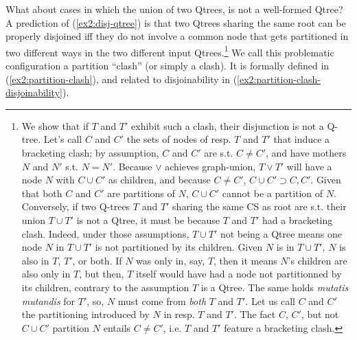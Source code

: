 
What about cases in which the union of two Qtrees, is not a well-formed Qtree? A prediction of (\ref{ex2:disj-qtree}) is that two Qtrees sharing the same root can be properly disjoined iff they do not involve a common node that gets partitioned in two different ways in the two different input Qtrees.\footnote{We show that if $T$ and $T'$ exhibit such a clash, their disjunction is not a Q-tree. Let's call $C$ and $C'$ the sets of nodes of resp. $T$ and $T'$ that induce a bracketing clash; by assumption, $C$ and $C'$ are s.t. $C\neq C'$, and have mothers $N$ and $N'$ s.t. $N=N'$. Because $\vee$ achieves graph-union, $T\vee T'$ will have a node $N$ with $C\cup C'$ as children, and because $C\neq C'$, $C\cup C' \supset C, C'$. Given that both $C$ and $C'$ are partitions of $N$, $C\cup C'$ cannot be a partition of $N$. Conversely, if two Q-trees $T$ and $T'$ sharing the same CS as root are s.t. their union $T \cup T'$ is not a Qtree, it must be because $T$ and $T'$ had a bracketing clash. Indeed, under those assumptions, $T \cup T'$ not being a Qtree means one node $N$ in $T \cup T'$ is not partitioned by its children. Given $N$ is in $T \cup T'$, $N$ is also in $T$, $T'$, or both. If $N$ was only in, say, $T$, then it means $N$'s children are also only in $T$, but then, $T$ itself would have had a node not partitionned by its children, contrary to the assumption $T$ is a Qtree. The same holds \textit{mutatis mutandis} for $T'$, so, $N$ must come from \textit{both} $T$ and $T'$. Let us call $C$ and $C'$ the partitioning introduced by $N$ in resp. $T$ and $T'$. The fact $C$, $C'$, but not $C \cup C'$ partition $N$ entails $C\neq C'$, i.e. $T$ and $T'$ feature a bracketing clash.} We call this problematic configuration a partition ``clash'' (or simply a clash). It is formally defined in (\ref{ex2:partition-clash}), and related to disjoinability in (\ref{ex2:partition-clash-disjoinability}).

\begin{exe}
	\label{ex2:partition-clash}
	\label{ex2:partition-clash-disjoinability}
\end{exe}

